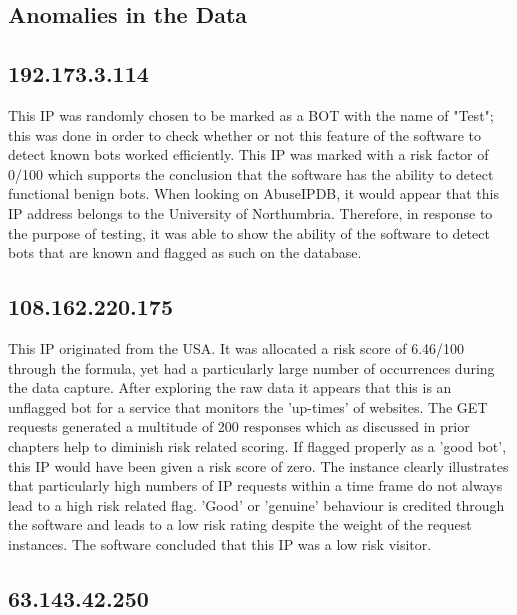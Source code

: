 \subsection{Anomalies in the Data}
\subsection*{192.173.3.114} 

This IP was randomly chosen to be marked as a BOT with the name of "Test"; this was done in order to check whether or not this feature of the software to detect known bots worked efficiently. This IP was marked with a risk factor of 0/100 which supports the conclusion that the software has the ability to detect functional benign bots. When looking on AbuseIPDB, it would appear that this IP address belongs to the University of Northumbria. Therefore, in response to the purpose of testing, it was able to show the ability of the software to detect bots that are known and flagged as such on the database.

\subsection*{108.162.220.175}

This IP originated from the USA. It was allocated a risk score of 6.46/100 through the formula, yet had a particularly large number of occurrences during the data capture. After exploring the raw data it appears that this is an unflagged bot for a service that monitors the 'up-times' of websites. The GET requests generated a multitude of 200 responses which as discussed in prior chapters help to diminish risk related scoring. If flagged properly as a 'good bot', this IP would have been given a risk score of zero. The instance clearly illustrates that particularly high numbers of IP requests within a time frame do not always lead to a high risk related flag. 'Good' or 'genuine' behaviour is credited through the software and leads to a low risk rating despite the weight of the request instances. The software concluded that this IP was a low risk visitor.

\subsection*{63.143.42.250}

